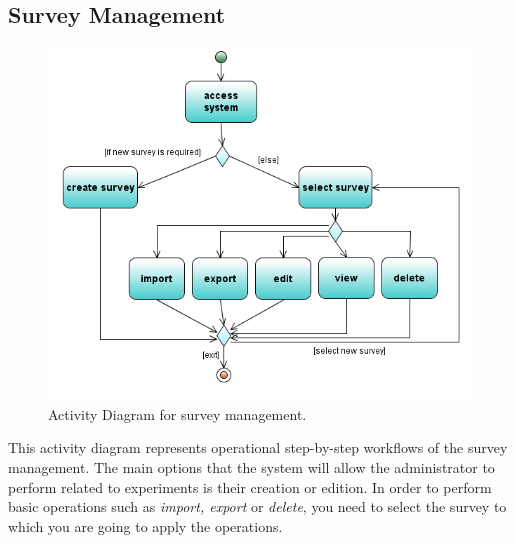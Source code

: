 \documentclass[a4paper,12pt,oneside]{report}
\begin{document}
\subsection{Survey Management}
\begin{figure}[!hp]
  \begin{center}
   \includegraphics[width=13.76cm]{pics/Activity2.png}
  \end{center}
\caption{Activity Diagram for survey management.}
\end{figure}
\vskip 1cm
This activity diagram represents operational step-by-step workflows of the survey management. The main options that the system will allow the administrator to perform related to experiments is their creation or edition. In order to perform basic operations such as {\it import, export} or {\it delete}, you need to select the survey to which you are going to apply the operations.

\pagebreak
\pagebreak
\end{document}
